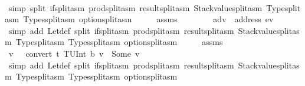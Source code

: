 \begin{isabellebody}
\ {}\ {}\ \isamarkupfalse%
\ {\isacharparenleft}{\kern0pt}simp\ split{\isacharcolon}{\kern0pt}\ if{\isacharunderscore}{\kern0pt}split{\isacharunderscore}{\kern0pt}asm\ prod{\isachardot}{\kern0pt}split{\isacharunderscore}{\kern0pt}asm\ result{\isachardot}{\kern0pt}split{\isacharunderscore}{\kern0pt}asm\ Stackvalue{\isachardot}{\kern0pt}split{\isacharunderscore}{\kern0pt}asm\ Type{\isachardot}{\kern0pt}split{\isacharunderscore}{\kern0pt}asm\ Types{\isachardot}{\kern0pt}split{\isacharunderscore}{\kern0pt}asm\ option{\isachardot}{\kern0pt}split{\isacharunderscore}{\kern0pt}asm{\isacharparenright}{\kern0pt}\isanewline
\ \ \isamarkupfalse%
\ \isamarkupfalse%
\ assms\ {}\ {}\ {}\ {}\ {}\ \isamarkupfalse%
\ {}{\isacharcolon}{\kern0pt}\ {\isachardoublequoteopen}adv\ {\isasymnoteq}\ address\ ev{\isachardoublequoteclose}\ \isamarkupfalse%
\ {\isacharparenleft}{\kern0pt}simp\ add{\isacharcolon}{\kern0pt}\ Let{\isacharunderscore}{\kern0pt}def\ split{\isacharcolon}{\kern0pt}\ if{\isacharunderscore}{\kern0pt}split{\isacharunderscore}{\kern0pt}asm\ prod{\isachardot}{\kern0pt}split{\isacharunderscore}{\kern0pt}asm\ result{\isachardot}{\kern0pt}split{\isacharunderscore}{\kern0pt}asm\ Stackvalue{\isachardot}{\kern0pt}split{\isacharunderscore}{\kern0pt}asm\ Type{\isachardot}{\kern0pt}split{\isacharunderscore}{\kern0pt}asm\ Types{\isachardot}{\kern0pt}split{\isacharunderscore}{\kern0pt}asm\ option{\isachardot}{\kern0pt}split{\isacharunderscore}{\kern0pt}asm{\isacharparenright}{\kern0pt}\isanewline
\ \ \isamarkupfalse%
\ \isamarkupfalse%
\ assms\ {}\ {}\ {}\ {}\ {}\ {}\ \isamarkupfalse%
\ v{\isacharprime}{\kern0pt}\ \ {}{\isacharcolon}{\kern0pt}\ {\isachardoublequoteopen}convert\ t\ {\isacharparenleft}{\kern0pt}TUInt\ b{}{}{}{\isacharparenright}{\kern0pt}\ v\ {\isacharequal}{\kern0pt}\ Some\ v{\isacharprime}{\kern0pt}{\isachardoublequoteclose}\ \isamarkupfalse%
\ {\isacharparenleft}{\kern0pt}simp\ add{\isacharcolon}{\kern0pt}\ Let{\isacharunderscore}{\kern0pt}def\ split{\isacharcolon}{\kern0pt}\ if{\isacharunderscore}{\kern0pt}split{\isacharunderscore}{\kern0pt}asm\ prod{\isachardot}{\kern0pt}split{\isacharunderscore}{\kern0pt}asm\ result{\isachardot}{\kern0pt}split{\isacharunderscore}{\kern0pt}asm\ Stackvalue{\isachardot}{\kern0pt}split{\isacharunderscore}{\kern0pt}asm\ Type{\isachardot}{\kern0pt}split{\isacharunderscore}{\kern0pt}asm\ Types{\isachardot}{\kern0pt}split{\isacharunderscore}{\kern0pt}asm\ option{\isachardot}{\kern0pt}split{\isacharunderscore}{\kern0pt}asm{\isacharparenright}{\kern0pt}\isanewline

\end{isabellebody}

